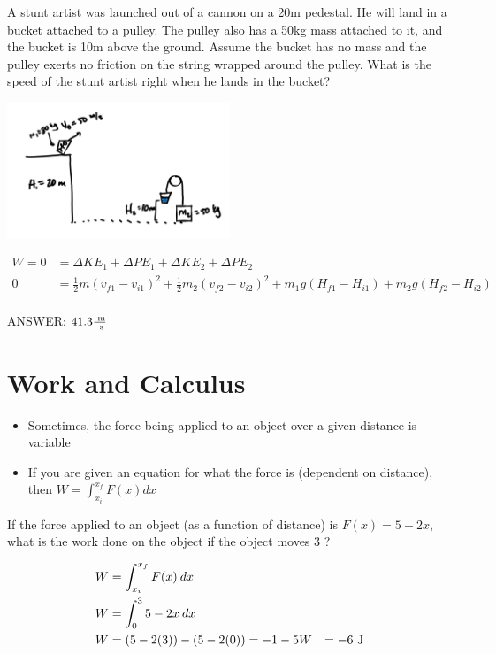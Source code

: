 \begin{problem}
    A stunt artist was launched out of a cannon on a 20m pedestal. He will land in a bucket attached to a pulley. The pulley also has a 50kg mass attached to it, and the bucket is 10m above the ground. Assume the bucket has no mass and the pulley exerts no friction on the string wrapped around the pulley. What is the speed of the stunt artist right when he lands in the bucket? 
    
    \begin{center}
        \includegraphics[width=0.5\textwidth]{chapters/ch4/images/fig4_7.PNG}
    \end{center}

    $$
    \begin{aligned}
        W = 0 &= \Delta KE_1 + \Delta PE_1 + \Delta KE_2 + \Delta PE_2\\
        0 &= \frac{1}{2}m(v_{f1}-v_{i1})^2 + \frac{1}{2}m_2(v_{f2}-v_{i2})^2 + m_1g(H_{f1} - H_{i1}) + m_2g(H_{f2} - H_{i2})\\
    \end{aligned}
    $$

    ANSWER: $41.3 \frac{\text{ m}}{\text{ s}}$
\end{problem}


\section{Work and Calculus}

\begin{itemize}
    \item Sometimes, the force being applied to an object over a given distance is variable
    \item If you are given an equation for what the force is (dependent on distance), then $W = \int_{x_i}^{x_f} F(x) dx$
\end{itemize}


\begin{problem}
    If the force applied to an object (as a function of distance) is $F(x) = 5 - 2x$, what is the work done on the object if the object moves 3 \m?

    $$
    \begin{aligned}
        W &= \int_{x_i}^{x_f} F(x) \: dx\\
        W &= \int_{0}^{3} 5-2x \: dx\\
        W &= (5-2(3))-(5-2(0)) = -1-5
        W &= -6 \text{ J}
    \end{aligned}
    $$
\end{problem}


